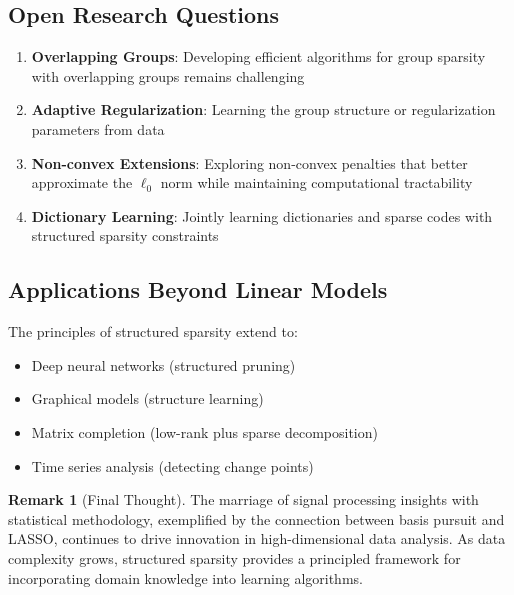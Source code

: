 \documentclass[12pt]{article}
\theoremstyle{definition}
\newtheorem{remark}{Remark}[section]
\begin{document}
\subsection{Open Research Questions}

\begin{enumerate}
    \item \textbf{Overlapping Groups}: Developing efficient algorithms for group sparsity with overlapping groups remains challenging

    \item \textbf{Adaptive Regularization}: Learning the group structure or regularization parameters from data

    \item \textbf{Non-convex Extensions}: Exploring non-convex penalties that better approximate the $\ell_0$ norm while maintaining computational tractability

    \item \textbf{Dictionary Learning}: Jointly learning dictionaries and sparse codes with structured sparsity constraints
\end{enumerate}

\subsection{Applications Beyond Linear Models}

The principles of structured sparsity extend to:
\begin{itemize}
    \item Deep neural networks (structured pruning)
    \item Graphical models (structure learning)
    \item Matrix completion (low-rank plus sparse decomposition)
    \item Time series analysis (detecting change points)
\end{itemize}

\begin{remark}[Final Thought]
    The marriage of signal processing insights with statistical methodology, exemplified by the connection between basis pursuit and LASSO, continues to drive innovation in high-dimensional data analysis. As data complexity grows, structured sparsity provides a principled framework for incorporating domain knowledge into learning algorithms.
\end{remark}
\end{document}

